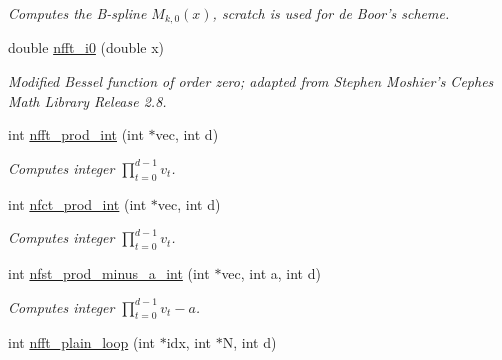 \begin{CompactItemize}
\begin{CompactList}\small\item\em Computes the B-spline $M_{k,0}\left(x\right)$, scratch is used for de Boor's scheme. \item\end{CompactList}\item 
double \hyperlink{group__nfftutil_g5d6e8d0901b95c0c48f719e517733e5b}{nfft\_\-i0} (double x)
\begin{CompactList}\small\item\em Modified Bessel function of order zero; adapted from Stephen Moshier's Cephes Math Library Release 2.8. \item\end{CompactList}\item 
\hypertarget{group__nfftutil_g2752ca372ee2622f173a706e86e2b116}{
int \hyperlink{group__nfftutil_g2752ca372ee2622f173a706e86e2b116}{nfft\_\-prod\_\-int} (int $\ast$vec, int d)}
\label{group__nfftutil_g2752ca372ee2622f173a706e86e2b116}

\begin{CompactList}\small\item\em Computes integer $\prod_{t=0}^{d-1} v_t$. \item\end{CompactList}\item 
\hypertarget{group__nfftutil_g9f0473beec441216c874021d2aa3064f}{
int \hyperlink{group__nfftutil_g9f0473beec441216c874021d2aa3064f}{nfct\_\-prod\_\-int} (int $\ast$vec, int d)}
\label{group__nfftutil_g9f0473beec441216c874021d2aa3064f}

\begin{CompactList}\small\item\em Computes integer $\prod_{t=0}^{d-1} v_t$. \item\end{CompactList}\item 
\hypertarget{group__nfftutil_g8adc6bf59ec10f16243030ee00ad4a40}{
int \hyperlink{group__nfftutil_g8adc6bf59ec10f16243030ee00ad4a40}{nfst\_\-prod\_\-minus\_\-a\_\-int} (int $\ast$vec, int a, int d)}
\label{group__nfftutil_g8adc6bf59ec10f16243030ee00ad4a40}

\begin{CompactList}\small\item\em Computes integer $\prod_{t=0}^{d-1} v_t-a$. \item\end{CompactList}\item 
\hypertarget{group__nfftutil_gd979f626cc8397e26d1bd78a7ba342cd}{
int \hyperlink{group__nfftutil_gd979f626cc8397e26d1bd78a7ba342cd}{nfft\_\-plain\_\-loop} (int $\ast$idx, int $\ast$N, int d)}
\label{group__nfftutil_gd979f626cc8397e26d1bd78a7ba342cd}


\end{CompactItemize}
